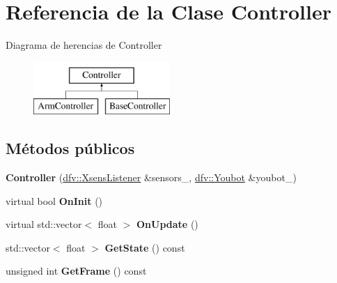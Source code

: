 \hypertarget{classController}{\section{\-Referencia de la \-Clase \-Controller}
\label{classController}
}
\-Diagrama de herencias de \-Controller\begin{figure}[H]
\begin{center}
\leavevmode
\includegraphics[height=2.000000cm]{classController}
\end{center}
\end{figure}
\subsection*{\-Métodos públicos}
\begin{DoxyCompactItemize}
\item 
\hypertarget{classController_a0a6ee42fa057aa2a57ef63b1303bf869}{{\bfseries \-Controller} (\hyperlink{classdfv_1_1XsensListener}{dfv\-::\-Xsens\-Listener} \&sensors\-\_\-, \hyperlink{classdfv_1_1Youbot}{dfv\-::\-Youbot} \&youbot\-\_\-)}\label{classController_a0a6ee42fa057aa2a57ef63b1303bf869}

\item 
\hypertarget{classController_a4b66f9c3177c6c87d746b71166b0638a}{virtual bool {\bfseries \-On\-Init} ()}\label{classController_a4b66f9c3177c6c87d746b71166b0638a}

\item 
\hypertarget{classController_affb40952c110db0d6660f021fc606d9b}{virtual std\-::vector$<$ float $>$ {\bfseries \-On\-Update} ()}\label{classController_affb40952c110db0d6660f021fc606d9b}

\item 
\hypertarget{classController_a5ce1aa0f511d51de499bad6e8bda1891}{std\-::vector$<$ float $>$ {\bfseries \-Get\-State} () const }\label{classController_a5ce1aa0f511d51de499bad6e8bda1891}

\item 
\hypertarget{classController_a6945e5f9537d48b2ac073a2d530b1ef7}{unsigned int {\bfseries \-Get\-Frame} () const }\label{classController_a6945e5f9537d48b2ac073a2d530b1ef7}

\end{DoxyCompactItemize}
